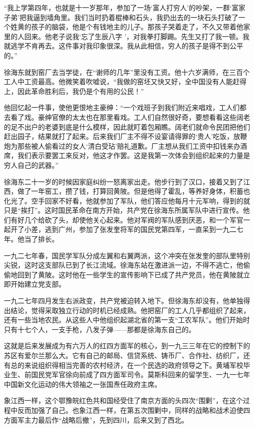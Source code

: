 \documentclass[10pt]{book}
\begin{document}
“我上学第四年，也就是十一岁那年，参加了一场‘富人打穷人’的吵架，一群‘富家子弟’把我逼到墙角里。我们当时扔着棍棒和石头，我扔出去的一块石头打破了一个姓黄的孩子的脑袋，他是个有钱地主的儿子。那孩子哭着走了，不久又带着他家里的人回来。他老子说我‘忘了生辰八字 ’，对我拳打脚踢。先生又打了我一顿。我就逃学不肯再去。这件事对我印象很深。我从此相信，穷人的孩子是得不到公平的。”

徐海东就到窑厂去当学徒，在“谢师的几年”里没有工资。他十六岁满师，在三百个工人中工资最高。他微笑着吹嘘说，“我做的窑坯又快又好，全中国没有人能赶得上，因此革命胜利后，我仍是个有用的公民！”

他回忆起一件事，使他更恨地主豪绅：“一个戏班子到我们附近来唱戏，工人们都去看了戏。豪绅官僚的太太也在那里看戏。工人们自然很好奇，要想看看这些阔老的足不出户的老婆到底是什么模样，因此就盯着包厢瞧。阔老们就命令民团把他们赶出园子，结果就打了起来。后来我们厂主不得不设宴请得罪的‘贵人’吃饭，放鞭炮为那些被人偷看过的女人‘清白受玷’赔礼道歉。厂主想从我们工资中扣钱来办酒席，我们表示要罢工来反对，他这才作罢。这是我第一次体会到组织起来的力量是穷人自己的武器。”

徐海东二十一岁的时候因家庭纠纷一怒离家出走。他步行到了汉口，接着又到了江西，做了一年窑工，攒了钱，打算回黄陂。但是他得了霍乱，等养好身体，积蓄也化光了。空手回家不好看，他就参加了军队，他们答应他每月十元军响，得到的就只是“挨打”。这时国民革命在南方开始，共产党在徐海东所属军队中进行宣传。他们有好几个给砍了头，却使他关心起来。他对军阀的军队感到厌恶，和一个军官一起开了小差，逃到广州，参加了张发奎将军的国民党第四军，一直呆到一九二七年。他当了排长。

一九二七年春，国民学军队分成左翼和右翼两派，这个冲突在张发奎的部队里特别尖锐，这时这支部队已到了长江流域。徐海东站在激进派一边，不得不逃亡，他偷偷地回到了黄陂。这时他在一些学生的宣传影响下已成了共产党员，他在黄陂就立即开始建立党支部。

一九二七年四月发生右派政变，共产党被迫转入地下。但徐海东却没有，他单独得出结论，觉得采取独立行动的时机已经成熟。他把窑厂的工人几乎都组织了起来，还有一些当地农民。从这些人中他组织起湖北省的第一支“工农军队”。他们开始时只有十七个人，一支手枪，八发子弹——那都是徐海东自己的。

这就是后来发展成为有六万人的红四方面军的核心，到一九三三年在它的控制下的苏区有爱尔兰那么大。它有自己的邮局、信贷系统、铸币厂、合作社、纺织厂，还有总的来说组织得相当完善的农村经济，在一个民选的政府领导之下。黄埔军校毕业生、前国民党军官徐向前成了四方面军司令。莫斯科回来的留学生、一九一七年中国新文化运动的伟大领袖之一张国焘任政府主席。

象江西一样，这个鄂豫皖红色共和国经受住了南京方面的头四次“围剿”，在这个过程中反而加强了自己。也象江西一样，在第五次围剿中，同样的战略和战术迫使四方面军主力最后作“战略后撤”，先到四川，后来又到了西北。
\end{document}
